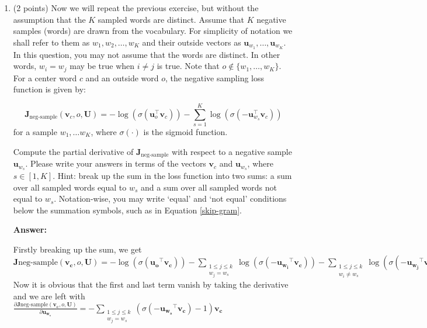 \documentclass{article}
\newenvironment{answer}{
    {\bf Answer:} \sf \begingroup\color{red}
}{\endgroup}%
\begin{document}
\begin{enumerate}[label=(\alph*)]
\item (2 points) Now we will repeat the previous exercise, but without the assumption that the $K$ sampled words are distinct.  Assume that $K$ negative samples (words) are drawn from the vocabulary. For simplicity of notation we shall refer to them as $w_1, w_2, \dots, w_K$ and their outside vectors as $\bm u_{w_1}, \dots, \bm u_{w_K}$. In this question, you may not assume that the words are distinct. In other words, $w_i=w_j$ may be true when $i\neq j$ is true.
Note that $o\notin\{w_1, \dots, w_K\}$. 
For a center word $c$ and an outside word $o$, the negative sampling loss function is given by:

\begin{equation}
\bm J_{\text{neg-sample}}(\bm v_c, o, \bm U) = -\log(\sigma(\bm u_o^\top \bm v_c)) - \sum_{s=1}^K \log(\sigma(-\bm u_{w_s}^\top \bm v_c))
\end{equation}
for a sample $w_1, \ldots w_K$, where $\sigma(\cdot)$ is the sigmoid function.

Compute the partial derivative of $\bm J_{\text{neg-sample}}$ with respect to a negative sample $\bm u_{w_s}$. Please write your answers in terms of the vectors $\bm v_c$ and $\bm u_{w_s}$, where $s \in [1, K]$. Hint: break up the sum in the loss function into two sums: a sum over all sampled words equal to $w_s$ and a sum over all sampled words not equal to $w_s$. Notation-wise, you may write `equal' and `not equal' conditions below the summation symbols, such as in Equation \ref{skip-gram}.

\begin{shaded}
\begin{answer}
Firstly breaking up the sum, we get \\
$\bm J {\text{neg-sample} } (\bm{v_c}, o, \bm{U})  
= -\log(\sigma(\bm{u_o}^\top \bm{v_c})) - \sum_{\substack{1\le j \le k \\ w_j = w_s}} \log(\sigma(-\bm{u_{w_i}}^\top \bm{v_c})) - \sum_{\substack{1\le j \le k \\ w_i \neq w_s}} \log(\sigma(-\bm{u_{w_j}}^\top \bm{v_c}))$ \\
Now it is obvious that the first and last term vanish by taking the derivative and we are left with \\
$\frac{\partial \bm J {\text{neg-sample} } (\bm{v_c}, o, \bm{U}) }{\partial \bm{u_{w_s}}} 
= - \sum_{\substack{1 \le j \le k \\ w_j = w_s}} (\sigma(-\bm{u_{w_s}}^\top \bm{v_c}) - 1) \bm{v_c}$
\end{answer}
\end{shaded}


\end{enumerate}
\end{document}
